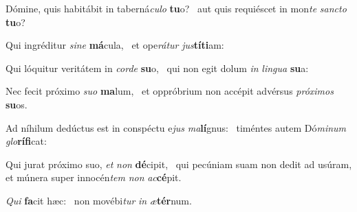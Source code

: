 \item Dómine, quis habitábit in taberná\textit{culo} \textbf{tu}o?~\psstar{} aut quis requiéscet in mon\textit{te} \textit{sancto} \textbf{tu}o?
\item Qui ingréditur \textit{sine} \textbf{má}cula,~\psstar{} et ope\textit{rátur} \textit{jus}\textbf{tí}\textbf{ti}am:
\item Qui lóquitur veritátem in \textit{corde} \textbf{su}o,~\psstar{} qui non egit dolum \textit{in} \textit{lingua} \textbf{su}a:
\item Nec fecit próximo \textit{suo} \textbf{ma}lum,~\psstar{} et oppróbrium non accépit advérsus \textit{próximos} \textbf{su}os.
\item Ad níhilum dedúctus est in conspéctu e\textit{jus} \textit{ma}\textbf{lí}gnus:~\psstar{} timéntes autem Dó\textit{minum} \textit{glo}\textbf{rí}\textbf{fi}cat:
\item Qui jurat próximo suo, \textit{et} \textit{non} \textbf{dé}cipit,~\psstar{} qui pecúniam suam non dedit ad usúram, et múnera super innocén\textit{tem} \textit{non} \textit{ac}\textbf{cé}pit.
\item \textit{Qui} \textbf{fa}cit hæc:~\psstar{} non movébi\textit{tur} \textit{in} \textit{æ}\textbf{tér}num.
